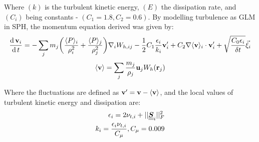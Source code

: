 Where $(k)$ is the turbulent kinetic energy, $(E)$ the dissipation rate, and $(C_i)$ being constants - $(C_1=1.8, C_2=0.6)$.
By modelling turbulence as GLM in SPH, the momentum equation derived was given by:
\begin{equation}
    \frac{\operatorname{d} \mathbf{v}_i}{\operatorname{d} t} = -\sum_j m_j \bigg( \frac{\langle P \rangle_i}{\rho_i^2} + \frac{\langle P \rangle_j}{\rho_j^2} \bigg) \nabla_{i} W_{h, ij} - \frac{1}{2} C_1 \frac{\epsilon_i}{k_i} \mathbf{v}'_i + C_2 \nabla \langle \mathbf{v} \rangle_i \cdot \mathbf{v}'_i + \sqrt{\frac{C_0 \epsilon_i}{\delta t}} \Vec{\xi}_i
    \label{eq:violeau-mom-glm}
\end{equation}
\begin{equation}
    \langle \mathbf{v} \rangle = \sum_j \frac{m_j}{\rho_j}\mathbf{u}_j W_h (\mathbf{r}_j)
    \label{eq:violeau-ra-vel}
\end{equation}

Where the fluctuations are defined as $\mathbf{v}' = \mathbf{v} - \langle \mathbf{v} \rangle$, and the local values of turbulent kinetic energy and dissipation are:
\begin{align}
    \epsilon_i = 2 \nu_{t, i} + 
    ||\underline{\underline{\bm{S}}}_i||_F^2 \\
    k_i = \frac{\epsilon_i \nu_{t, i}}{C_{\mu}}, C_{\mu} = 0.009
    \label{eq:violeau-k-eps}
\end{align}

